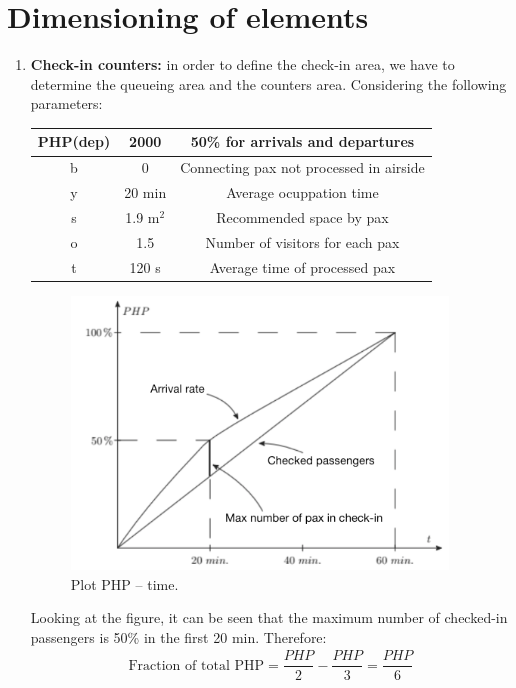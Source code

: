 	\section{Dimensioning of elements}
\begin{enumerate}
\item \textbf{Check-in counters:} in order to define the check-in area, we have to determine the queueing area and the counters area. Considering the following parameters:
\begin{table}[ht!]
\centering
\begin{tabular}{|c|c|c|}
\hline
PHP(dep) & 2000 & 50\% for arrivals and departures\\
\hline 
b & 0 & Connecting pax not processed in airside\\
\hline
y & 20 min & Average ocuppation time\\
\hline 
s & 1.9 $\mathrm{m^2}$ & Recommended space by pax\\
\hline
o & 1.5 & Number of visitors for each pax\\
\hline 
t & 120 s & Average time of processed pax\\
\hline
\end{tabular}
\end{table}

\begin{figure}[ht!]
	\centering
\includegraphics[width=10cm]{./images/graf1}
\caption{Plot PHP -- time.}
\end{figure}

Looking at the figure, it can be seen that the maximum number of checked-in passengers is 50\% in the first 20 min. Therefore:
\begin{align*}
\text{Fraction of total PHP} = \dfrac{PHP}{2}-\dfrac{PHP}{3}=\dfrac{PHP}{6}
\end{align*}


\end{enumerate}
